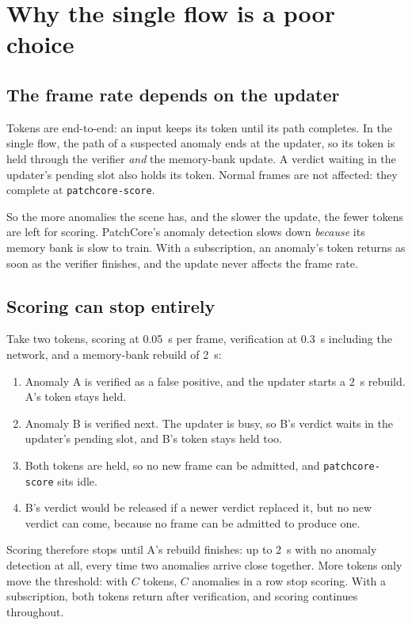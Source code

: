 \documentclass[11pt]{article}
\newcommand{\code}[1]{\texttt{#1}}
\begin{document}
\section{Why the single flow is a poor choice}

\subsection{The frame rate depends on the updater}

Tokens are end-to-end: an input keeps its token until its path completes. In
the single flow, the path of a suspected anomaly ends at the updater, so its
token is held through the verifier \emph{and} the memory-bank update. A
verdict waiting in the updater's pending slot also holds its token. Normal
frames are not affected: they complete at \code{patchcore-score}.

So the more anomalies the scene has, and the slower the update, the fewer
tokens are left for scoring. PatchCore's anomaly detection slows down
\emph{because} its memory bank is slow to train. With a subscription, an
anomaly's token returns as soon as the verifier finishes, and the update never
affects the frame rate.

\subsection{Scoring can stop entirely}

Take two tokens, scoring at 0.05~s per frame, verification at 0.3~s including
the network, and a memory-bank rebuild of 2~s:
\begin{enumerate}[nosep]
  \item Anomaly A is verified as a false positive, and the updater starts a
        2~s rebuild. A's token stays held.
  \item Anomaly B is verified next. The updater is busy, so B's verdict waits in
        the updater's pending slot, and B's token stays held too.
  \item Both tokens are held, so no new frame can be admitted, and
        \code{patchcore-score} sits idle.
  \item B's verdict would be released if a newer verdict replaced it, but no
        new verdict can come, because no frame can be admitted to produce one.
\end{enumerate}
Scoring therefore stops until A's rebuild finishes: up to 2~s with no anomaly
detection at all, every time two anomalies arrive close together. More tokens
only move the threshold: with $C$ tokens, $C$ anomalies in a row stop scoring.
With a subscription, both tokens return after verification, and scoring
continues throughout.
\end{document}
